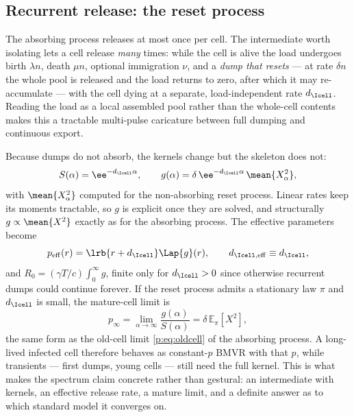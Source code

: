 \subsection{Recurrent release: the reset process}
\label{p:sec:reset}

The absorbing process releases at most once per cell. The intermediate worth
isolating lets a cell release \emph{many} times: while the cell is alive the
load undergoes birth $\lambda n$, death $\mu n$, optional immigration $\nu$,
and a \emph{dump that resets} --- at rate $\delta n$ the whole pool is
released and the load returns to zero, after which it may re-accumulate ---
with the cell dying at a separate, load-independent rate $d_{\Icell}$.
Reading the load as a local assembled pool rather than the whole-cell
contents makes this a tractable multi-pulse caricature between full dumping
and continuous export.

Because dumps do not absorb, the kernels change but the skeleton does not:
\begin{equation}
S(\alpha)=\ee^{-d_{\Icell}\alpha},
\qquad
g(\alpha)=\delta\,\ee^{-d_{\Icell}\alpha}\,\mean{X_\alpha^2},
\label{p:eq:reset-kernels}
\end{equation}
with $\mean{X_\alpha^2}$ computed for the non-absorbing reset process. Linear
rates keep its moments tractable, so $g$ is explicit once they are solved,
and structurally $g\propto\mean{X^2}$ exactly as for the absorbing process.
The effective parameters become
\begin{equation}
p_{\rm eff}(r)=\lrb{r+d_{\Icell}}\Lap{g}(r),
\qquad
d_{\Icell,{\rm eff}}\equiv d_{\Icell},
\label{p:eq:reset-peff}
\end{equation}
and $R_0=(\gamma T/c)\int_0^\infty g$, finite only for $d_{\Icell}>0$ since
otherwise recurrent dumps could continue forever. If the reset process
admits a stationary law $\pi$ and $d_{\Icell}$ is small, the mature-cell
limit is
\begin{equation}
p_\infty=\lim_{\alpha\to\infty}\frac{g(\alpha)}{S(\alpha)}
=\delta\,\mathbb{E}_\pi[X^2],
\label{p:eq:reset-mature}
\end{equation}
the same form as the old-cell limit \cref{p:eq:oldcell} of the absorbing
process. A long-lived infected cell therefore behaves as constant-$p$ BMVR
with that $p$, while transients --- first dumps, young cells --- still need
the full kernel. This is what makes the spectrum claim concrete rather than
gestural: an intermediate with kernels, an effective release rate, a mature
limit, and a definite answer as to which standard model it converges on.

